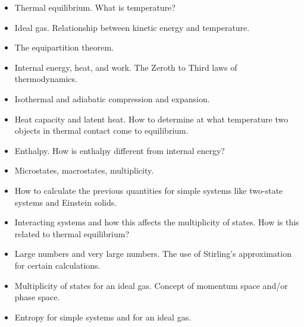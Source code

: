 \begin{itemize}[itemsep=0pt,parsep=0pt,topsep=0pt,partopsep=0pt]
\item Thermal equilibrium. What is temperature?
\item Ideal gas. Relationship between kinetic energy and temperature.
\item The equipartition theorem.
\item Internal energy, heat, and work. The Zeroth to Third laws of thermodynamics.
\item Isothermal and adiabatic compression and expansion.
\item Heat capacity and latent heat. How to determine at what temperature
two objects in thermal contact come to equilibrium.
\item Enthalpy. How is enthalpy different from internal energy?
\end{itemize}

\vspace{0.2cm}
\begin{itemize}[itemsep=0pt,parsep=0pt,topsep=0pt,partopsep=0pt]
\item Microstates, macrostates, multiplicity.
\item How to calculate the previous quantities for simple systems
like two-state systems and Einstein solids.
\item Interacting systems and how this affects the multiplicity
of states. How is this related to thermal equilibrium?
\item Large numbers and very large numbers. The use of Stirling's
approximation for certain calculations.
\item Multiplicity of states for an ideal gas. Concept of momentum
space and/or phase space.
\item Entropy for simple systems and for an ideal gas.
\end{itemize}

